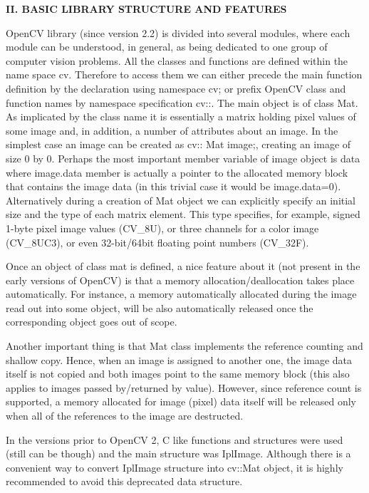 \documentclass{bjtu-bachelor-thesis}
\begin{document}
\textbf{II. BASIC LIBRARY STRUCTURE AND FEATURES} \par
OpenCV library (since version 2.2) is divided into several modules, where each module can be understood, in general, as being dedicated to one group of computer vision problems. All the classes and functions are defined within the name space cv. Therefore to access them we can either precede the main function definition by the declaration using namespace cv; or prefix OpenCV class and function names by namespace specification cv::. The main object is of class Mat. As implicated by the class name it is essentially a matrix holding pixel values of some image and, in addition, a number of attributes about an image. In the simplest case an image can be created as cv:: Mat image;, creating an image of size 0 by 0. Perhaps the most important member variable of image object is data where image.data member is actually a pointer to the allocated memory block that contains the image data (in this trivial case it would be image.data=0). Alternatively during a creation of Mat object we can explicitly specify an initial size and the type of each matrix element. This type specifies, for example, signed 1-byte pixel image values (CV\_8U), or three channels for a color image (CV\_8UC3), or even 32-bit/64bit floating point numbers (CV\_32F).\par
Once an object of class mat is defined, a nice feature about it (not present in the early versions of OpenCV) is that a memory allocation/deallocation takes place automatically. For instance, a memory automatically allocated during the image read out into some object, will be also automatically released once the corresponding object goes out of scope.\par
Another important thing is that Mat class implements the reference counting and shallow copy. Hence, when an image is assigned to another one, the image data itself is not copied and both images point to the same memory block (this also applies to images passed by/returned by value). However, since reference count is supported, a memory allocated for image (pixel) data itself will be released only when all of the references to the image are destructed.\par
In the versions prior to OpenCV 2, C like functions and structures were used (still can be though) and the main structure was IplImage. Although there is a convenient way to convert IplImage structure into cv::Mat object, it is highly recommended to avoid this deprecated data structure.\par
\end{document}

